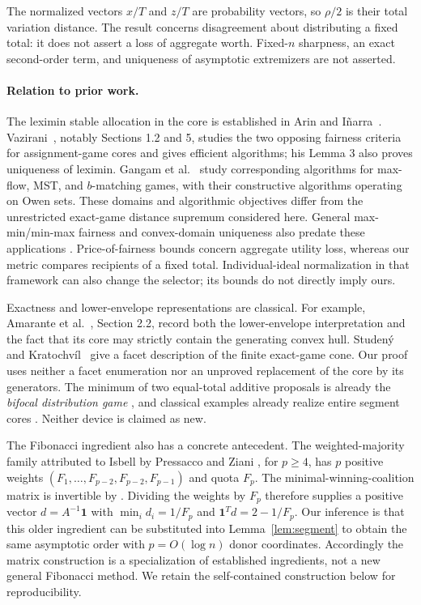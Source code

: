 \documentclass[11pt]{article}
\newcommand{\one}{\mathbf1}
\begin{document}
The normalized vectors $x/T$ and $z/T$ are probability vectors, so
$\rho/2$ is their total variation distance. The result concerns disagreement
about distributing a fixed total: it does not assert a loss of aggregate
worth. Fixed-$n$ sharpness, an exact second-order term, and uniqueness of
asymptotic extremizers are not asserted.

\paragraph{Relation to prior work.}
The leximin stable allocation in the core is established in Arin and
I\~narra~\cite{arin-inarra}. Vazirani~\cite{vazirani}, notably Sections 1.2
and 5, studies the two opposing fairness criteria for assignment-game
cores and gives efficient algorithms; his Lemma 3 also proves uniqueness
of leximin. Gangam et al.~\cite{gangam} study corresponding algorithms for
max-flow, MST, and $b$-matching games, with their constructive algorithms
operating on Owen sets. These domains and algorithmic objectives differ
from the unrestricted exact-game distance supremum considered here.
General max-min/min-max fairness and convex-domain uniqueness also predate
these applications \cite{radunovic,abernethy}. Price-of-fairness bounds
\cite{bertsimas} concern aggregate utility loss, whereas our metric compares
recipients of a fixed total. Individual-ideal normalization in that framework
can also change the selector; its bounds do not directly imply ours.

Exactness and lower-envelope representations are classical. For example,
Amarante et al.~\cite{amarante}, Section 2.2, record both the lower-envelope
interpretation and the fact that its core may strictly contain the
generating convex hull. Studen\'y and Kratochv\'il~\cite{studeny} give a
facet description of the finite exact-game cone. Our proof uses neither a
facet enumeration nor an unproved replacement of the core by its generators.
The minimum of two equal-total additive proposals is already the
\emph{bifocal distribution game} \cite{bifocal}, and classical examples
already realize entire segment cores \cite{shellshear}. Neither device is
claimed as new.

The Fibonacci ingredient also has a concrete antecedent. The weighted-majority
family attributed to Isbell by Pressacco and Ziani \cite{pressacco15}, for
$p\ge4$, has
$p$ positive weights
$(F_1,\ldots,F_{p-2},F_{p-2},F_{p-1})$ and quota $F_p$.
The minimal-winning-coalition matrix is invertible by
\cite[Theorem~4.2]{pressacco14}. Dividing the weights by $F_p$ therefore
supplies a positive vector $d=A^{-1}\one$ with
$\min_i d_i=1/F_p$ and $\one^Td=2-1/F_p$.
Our inference is that this older ingredient can be substituted into
Lemma~\ref{lem:segment} to obtain the same asymptotic order with
$p=O(\log n)$ donor coordinates. Accordingly the matrix construction is a
specialization of established ingredients, not a new general Fibonacci
method. We retain the self-contained construction below for reproducibility.
\end{document}
